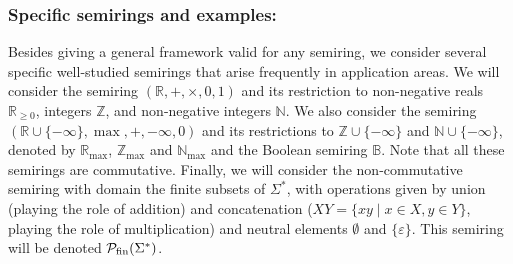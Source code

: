 \documentclass{lmcs}
\numberwithin{theorem}{section}
\begin{document}
\subsubsection*{\textbf{Specific semirings and examples:}} Besides giving a general framework valid for any semiring, we  consider several specific well-studied semirings that arise frequently in application areas.
We will consider the semiring $(\mathbb{R},+,\times,0,1)$ and its restriction to non-negative reals $\mathbb{R}_{\geq 0}$, integers $\mathbb{Z}$, and non-negative integers $\mathbb{N}$. We also consider the semiring $(\mathbb{R}\cup\{-\infty\},\max,+,-\infty,0)$ and its restrictions to $\mathbb{Z}\cup\{-\infty\}$ and $\mathbb{N}\cup\{-\infty\}$, denoted by $\mathbb{R}_{\max}$,  $\mathbb{Z}_{\max}$ and $\mathbb{N}_{\max}$ and the Boolean semiring $\mathbb{B}$. Note that all these semirings are commutative. Finally, we will consider the non-commutative semiring with domain the finite subsets of $\Sigma^*$, with operations given by union (playing the role of addition) and concatenation ($XY = \{xy \mid x\in X, y \in Y\}$, playing the role of multiplication) and neutral elements $\emptyset$ and $\{\varepsilon\}$. This semiring will be denoted $\mathcal{P}_{\rm fin}(\Sigma^*)$. 
\end{document}
